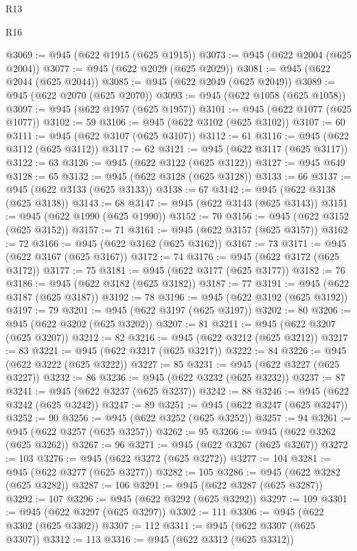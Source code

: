 \begin{lexlean}{R13}
\begin{lexlean}{R16}
\begin{coremodule}
{{{{{{{{{{{{{{{{{{{{{{{{{{{{{{{{{{{{{{{{{{{{{{{{{{{{{{{{{{{{{{{{{{{{{{{{{{{{{{{{{{{{{{{{{{{{{{{{{{{{{{{{{{{{{{{{{@3069 := @945 (@622 @1915 (@625 @1915))
@3073 := @945 (@622 @2004 (@625 @2004))
@3077 := @945 (@622 @2029 (@625 @2029))
@3081 := @945 (@622 @2044 (@625 @2044))
@3085 := @945 (@622 @2049 (@625 @2049))
@3089 := @945 (@622 @2070 (@625 @2070))
@3093 := @945 (@622 @1058 (@625 @1058))
@3097 := @945 (@622 @1957 (@625 @1957))
@3101 := @945 (@622 @1077 (@625 @1077))
@3102 := 59
@3106 := @945 (@622 @3102 (@625 @3102))
@3107 := 60
@3111 := @945 (@622 @3107 (@625 @3107))
@3112 := 61
@3116 := @945 (@622 @3112 (@625 @3112))
@3117 := 62
@3121 := @945 (@622 @3117 (@625 @3117))
@3122 := 63
@3126 := @945 (@622 @3122 (@625 @3122))
@3127 := @945 @649
@3128 := 65
@3132 := @945 (@622 @3128 (@625 @3128))
@3133 := 66
@3137 := @945 (@622 @3133 (@625 @3133))
@3138 := 67
@3142 := @945 (@622 @3138 (@625 @3138))
@3143 := 68
@3147 := @945 (@622 @3143 (@625 @3143))
@3151 := @945 (@622 @1990 (@625 @1990))
@3152 := 70
@3156 := @945 (@622 @3152 (@625 @3152))
@3157 := 71
@3161 := @945 (@622 @3157 (@625 @3157))
@3162 := 72
@3166 := @945 (@622 @3162 (@625 @3162))
@3167 := 73
@3171 := @945 (@622 @3167 (@625 @3167))
@3172 := 74
@3176 := @945 (@622 @3172 (@625 @3172))
@3177 := 75
@3181 := @945 (@622 @3177 (@625 @3177))
@3182 := 76
@3186 := @945 (@622 @3182 (@625 @3182))
@3187 := 77
@3191 := @945 (@622 @3187 (@625 @3187))
@3192 := 78
@3196 := @945 (@622 @3192 (@625 @3192))
@3197 := 79
@3201 := @945 (@622 @3197 (@625 @3197))
@3202 := 80
@3206 := @945 (@622 @3202 (@625 @3202))
@3207 := 81
@3211 := @945 (@622 @3207 (@625 @3207))
@3212 := 82
@3216 := @945 (@622 @3212 (@625 @3212))
@3217 := 83
@3221 := @945 (@622 @3217 (@625 @3217))
@3222 := 84
@3226 := @945 (@622 @3222 (@625 @3222))
@3227 := 85
@3231 := @945 (@622 @3227 (@625 @3227))
@3232 := 86
@3236 := @945 (@622 @3232 (@625 @3232))
@3237 := 87
@3241 := @945 (@622 @3237 (@625 @3237))
@3242 := 88
@3246 := @945 (@622 @3242 (@625 @3242))
@3247 := 89
@3251 := @945 (@622 @3247 (@625 @3247))
@3252 := 90
@3256 := @945 (@622 @3252 (@625 @3252))
@3257 := 94
@3261 := @945 (@622 @3257 (@625 @3257))
@3262 := 95
@3266 := @945 (@622 @3262 (@625 @3262))
@3267 := 96
@3271 := @945 (@622 @3267 (@625 @3267))
@3272 := 103
@3276 := @945 (@622 @3272 (@625 @3272))
@3277 := 104
@3281 := @945 (@622 @3277 (@625 @3277))
@3282 := 105
@3286 := @945 (@622 @3282 (@625 @3282))
@3287 := 106
@3291 := @945 (@622 @3287 (@625 @3287))
@3292 := 107
@3296 := @945 (@622 @3292 (@625 @3292))
@3297 := 109
@3301 := @945 (@622 @3297 (@625 @3297))
@3302 := 111
@3306 := @945 (@622 @3302 (@625 @3302))
@3307 := 112
@3311 := @945 (@622 @3307 (@625 @3307))
@3312 := 113
@3316 := @945 (@622 @3312 (@625 @3312))
}}}}}}}}}}}}}}}}}}}}}}}}}}}}}}}}}}}}}}}}}}}}}}}}}}}}}}}}}}}}}}}}}}}}}}}}}}}}}}}}}}}}}}}}}}}}}}}}}}}}}}}}}}}}}}}}}
\end{coremodule}
\end{lexlean}
\end{lexlean}

